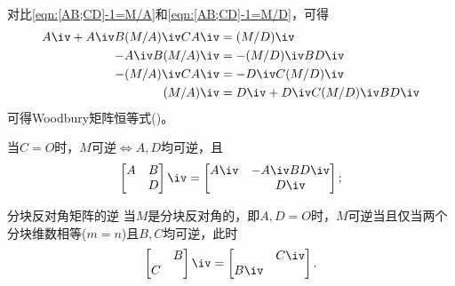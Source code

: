 \begin{corollary}
	对比\eqref{eqn:[AB;CD]-1=M/A}和\eqref{eqn:[AB;CD]-1=M/D}，可得
	\begin{subequations}
		\begin{align}
			A\iv+A\iv B(M/A)\iv CA\iv&=(M/D)\iv\\
			-A\iv B(M/A)\iv&=-(M/D)\iv BD\iv\\
			-(M/A)\iv CA\iv&=-D\iv C(M/D)\iv\\
			(M/A)\iv&=D\iv+D\iv C(M/D)\iv BD\iv
		\end{align}
	\end{subequations}
	可得Woodbury矩阵恒等式()。
\end{corollary}

\begin{corollary}
	当$C=O$时，$M$可逆$\iff A,D$均可逆，且
	\begin{equation}
		\begin{bmatrix}
			A&B\\ &D
		\end{bmatrix}\iv=\begin{bmatrix}
			A\iv&-A\iv BD\iv\\
			& D\iv
		\end{bmatrix};
	\end{equation}
\end{corollary}

\begin{theorem}
	{分块反对角矩阵的逆}{}
	当$M$是分块反对角的，即$A,D=O$时，$M$可逆当且仅当两个分块维数相等($m=n$)且$B,C$均可逆，此时
	\begin{equation}
		\begin{bmatrix}
			&B\\C
		\end{bmatrix}\iv=\begin{bmatrix}
			&C\iv\\B\iv
		\end{bmatrix}.
	\end{equation}
\end{theorem}


